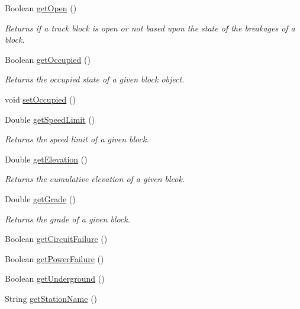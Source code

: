\begin{DoxyCompactItemize}
Boolean \hyperlink{classTrackModel_1_1Block_a5488f8e2329f780616c0189d31269a85}{get\+Open} ()
\begin{DoxyCompactList}\small\item\em Returns if a track block is open or not based upon the state of the breakages of a block. \end{DoxyCompactList}\item 
Boolean \hyperlink{classTrackModel_1_1Block_abd32beccef518c0e4622b2df1fd4ed54}{get\+Occupied} ()
\begin{DoxyCompactList}\small\item\em Returns the occupied state of a given block object. \end{DoxyCompactList}\item 
void \hyperlink{classTrackModel_1_1Block_a5a3c1477275fe3e3c7d0aaf4d7c32449}{set\+Occupied} ()
\item 
Double \hyperlink{classTrackModel_1_1Block_a68017a799915e4ef46455537ef41d124}{get\+Speed\+Limit} ()
\begin{DoxyCompactList}\small\item\em Returns the speed limit of a given block. \end{DoxyCompactList}\item 
Double \hyperlink{classTrackModel_1_1Block_a81c9de1ea89cce3046e9b6efc17871da}{get\+Elevation} ()
\begin{DoxyCompactList}\small\item\em Returns the cumulative elevation of a given blcok. \end{DoxyCompactList}\item 
Double \hyperlink{classTrackModel_1_1Block_ac33d34db48b02b47a035172af6025a7e}{get\+Grade} ()
\begin{DoxyCompactList}\small\item\em Returns the grade of a given block. \end{DoxyCompactList}\item 
Boolean \hyperlink{classTrackModel_1_1Block_a357ab105c5108e9656d10954fab85426}{get\+Circuit\+Failure} ()
\item 
Boolean \hyperlink{classTrackModel_1_1Block_abcfeb805be53d52f8034ba3eb629299d}{get\+Power\+Failure} ()
\item 
Boolean \hyperlink{classTrackModel_1_1Block_a8e946c966bec108e6540a6dc2321515e}{get\+Underground} ()
\item 
String \hyperlink{classTrackModel_1_1Block_a4fa53c36ff1ba06c6178dc651fd9bc4e}{get\+Station\+Name} ()
\item 

\end{DoxyCompactItemize}
